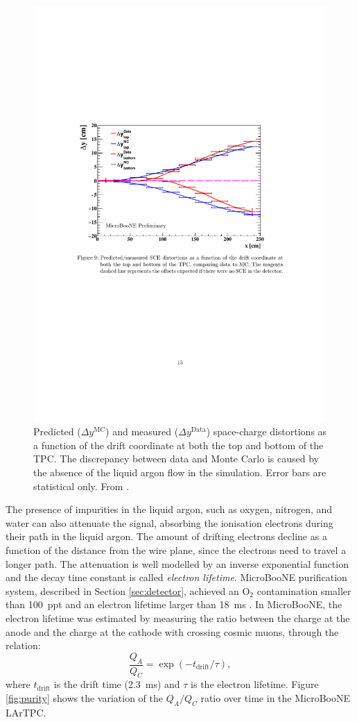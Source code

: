 \begin{figure}[htbp]
    \centering
    \includegraphics[width=0.8\linewidth]{figures/spacecharge.pdf}
    \caption{Predicted ($\Delta y^{\mathrm{MC}}$) and measured ($\Delta y^{\mathrm{Data}}$) space-charge distortions as a function of the drift coordinate at both the top and bottom of the TPC. The discrepancy between data and Monte Carlo is caused by the absence of the liquid argon flow in the simulation. Error bars are statistical only. From \cite{sce}.}
    \label{fig:spacecharge}
\end{figure}

The presence of impurities in the liquid argon, such as oxygen, nitrogen, and water can also attenuate the signal, absorbing the ionisation electrons during their path in the liquid argon. The amount of drifting electrons decline as a function of the distance from the wire plane, since the electrons need to travel a longer path. The attenuation is well modelled by an inverse exponential function and the decay time constant is called \emph{electron lifetime}. MicroBooNE purification system, described in Section \ref{sec:detector}, achieved an O$_2$ contamination smaller than 100~ppt and an electron lifetime larger than 18~ms \cite{Meddage:2017lxo}. In MicroBooNE, the electron lifetime was estimated by measuring the ratio between the charge at the anode and the charge at the cathode with crossing cosmic muons, through the relation:
\begin{equation}
    \frac{Q_A}{Q_C} = \exp(-t_{\mathrm{drift}}/\tau),
\end{equation}
where $t_\mathrm{drift}$ is the drift time (2.3~ms) and $\tau$ is the electron lifetime. Figure \ref{fig:purity} shows the variation of the $Q_A/Q_C$ ratio over time in the MicroBooNE LArTPC.

